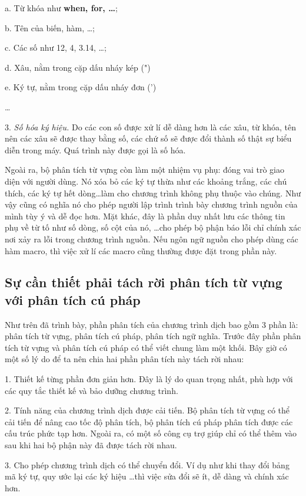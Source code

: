 a. Từ khóa như \textbf{when, for, \dots};

b. Tên của biến, hàm, \dots;

c. Các số như 12, 4, 3.14, \dots;

d. Xâu, nằm trong cặp dấu nháy kép (")

e. Ký tự, nằm trong cặp dấu nháy đơn (')

\dots

3. {\itshape Số hóa ký hiệu.} Do các con số được xử lí dễ dàng hơn là các xâu, từ khóa, tên nên các xâu sẽ được thay bằng số, các chứ số sẽ được đổi thành số thật sự biểu diễn trong máy. Quá trình này được gọi là số hóa.

Ngoài ra, bộ phân tích từ vựng còn làm một nhiệm vụ phụ: đóng vai trò giao diện với người dùng. Nó xóa bỏ các ký tự thừa như các khoảng trắng, các chú thích, các ký tự hết dòng\dots\space làm cho chương trình không phụ thuộc vào chúng. Như vậy cũng có nghĩa nó cho phép người lập trình trình bày chương trình nguồn của mình tùy ý và dễ đọc hơn. Mặt khác, đây là phần duy nhất lưu các thông tin phụ về từ tố như số dòng, số cột của nó, \dots\space cho phép bộ phận báo lỗi chỉ chính xác nơi xảy ra lỗi trong chương trình nguồn. Nếu ngôn ngữ nguồn cho phép dùng các hàm macro, thì việc xử lí các macro cũng thường được đặt trong phần này.

\subsection{Sự cần thiết phải tách rời phân tích từ vựng với phân tích cú pháp}
Như trên đã trình bày, phần phân tích của chương trình dịch bao gồm 3 phần là: phân tích từ vựng, phân tích cú pháp, phân tích ngữ nghĩa. Trước đây phần phân tích từ vựng và phân tích cú pháp có thể viết chung làm một khối. Bây giờ có một số lý do để ta nên chia hai phần phân tích này tách rời nhau:

1. Thiết kế từng phần đơn giản hơn. Đây là lý do quan trọng nhất, phù hợp với các quy tắc thiết kế và bảo dưỡng chương trình.

2. Tính năng của chương trình dịch được cải tiến. Bộ phân tích từ vựng có thể cải tiến để nâng cao tốc độ phân tích, bộ phân tích cú pháp phân tích được các cấu trúc phức tạp hơn. Ngoài ra, có một số công cụ trợ giúp chỉ có thể thêm vào sau khi hai bộ phận này đã được tách rời nhau.

3. Cho phép chương trình dịch có thể chuyển đổi. Ví dụ như khi thay đổi bảng mã ký tự, quy ước lại các ký hiệu \dots\space thì việc sửa đổi sẽ ít, dễ dàng và chính xác hơn.

